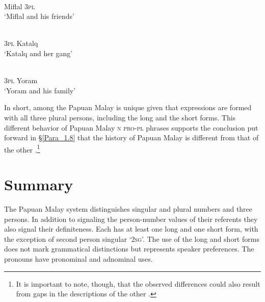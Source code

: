  
\begin{styleExampleTitle}
 \citep{Slomanson.2013}
\end{styleExampleTitle}


\ea

\label{Example_6.107}
 {}\\ %
 Miflal  \textsc{3pl}\\
 \glt ‘Miflal and his friends’\\
\z


\begin{styleExampleTitle}
 \citep[7]{Tadmor.2002}
\end{styleExampleTitle}


\ea

\label{Example_6.108}
 {}\\ %
 \textsc{3pl}  Katalq    \\
 \glt ‘Katalq and her gang’\\
\z


\begin{styleExampleTitle}
 \citep[30]{Stoel.2005}
\end{styleExampleTitle}


\ea

\label{Example_6.109}
 {}\\ %
 \textsc{3pl}  Yoram    \\
 \glt ‘Yoram and his family’\\
\z



In short, among the  Papuan Malay is unique given that  expressions are formed with all three plural persons, including the long and the short  forms. This different behavior of Papuan Malay \textsc{n} \textsc{pro-pl}  phrases supports the conclusion put forward in §\ref{Para_1.8} that the history of Papuan Malay is different from that of the other .\footnote{It is important to note, though, that the observed differences could also result from gaps in the descriptions of the other .}


\section{Summary}
\label{Para_6.3}
The Papuan Malay  system distinguishes singular and plural numbers and three persons. In addition to signaling the person-number values of their referents they also signal their definiteness. Each  has at least one long and one short form, with the exception of second person singular  ‘\textsc{2sg}’. The use of the long and short forms does not mark grammatical distinctions but represents speaker preferences. The pronouns have pronominal and adnominal uses.




